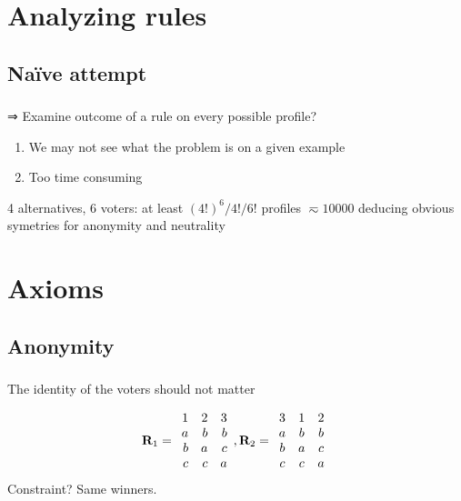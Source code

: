 \documentclass[french,english]{beamer}
\begin{document}
\section{Analyzing rules}
\subsection{Naïve attempt}
\begin{frame}
	\frametitle{\subsecname}
	⇒ Examine outcome of a rule on every possible profile?
	\begin{enumerate}
		\item We may not see what the problem is on a given example
		\item Too time consuming
	\end{enumerate}
	4 alternatives, 6 voters: at least $(4!)^6/4!/6!$ profiles $\eqsim \si{10000}$ {\tiny deducing obvious symetries for anonymity and neutrality}
\end{frame}

\section{Axioms}
\subsection{Anonymity}
\begin{frame}
	\frametitle{\subsecname}
	\begin{definition}[Anonymity]
		The identity of the voters should not matter
	\end{definition}
	\begin{equation}
		\mathbf{R}_1 =
		\begin{array}{rrr}
			1&2&3\\
			a&b&b\\
			b&a&c\\
			c&c&a\\
		\end{array},
		\mathbf{R}_2 =
		\begin{array}{ccc}
			3&1&2\\
			a&b&b\\
			b&a&c\\
			c&c&a\\
		\end{array}
	\end{equation}
	Constraint? \pause Same winners.
\end{frame}
\end{document}
